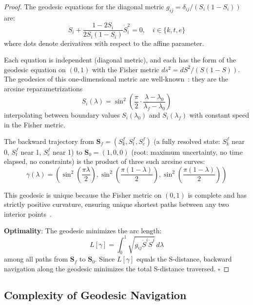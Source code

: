 \documentclass[12pt,twocolumn]{article}
\begin{document}
\begin{proof}
The geodesic equations for the diagonal metric $g_{ij} = \delta_{ij} / (S_i(1-S_i))$ are:
\begin{equation}
\label{eq:geodesic}
\ddot{S}_i + \frac{1-2S_i}{2S_i(1-S_i)} \dot{S}_i^2 = 0, \quad i \in \{k, t, e\}
\end{equation}
where dots denote derivatives with respect to the affine parameter.

Each equation is independent (diagonal metric), and each has the form of the geodesic equation on $(0,1)$ with the Fisher metric $ds^2 = dS^2 / (S(1-S))$. The geodesics of this one-dimensional metric are well-known~\cite{amari1985differential}: they are the arcsine reparametrizations
\begin{equation}
\label{eq:geodesic_solution}
S_i(\lambda) = \sin^2\!\left(\frac{\pi}{2} \cdot \frac{\lambda - \lambda_0}{\lambda_f - \lambda_0}\right)
\end{equation}
interpolating between boundary values $S_i(\lambda_0)$ and $S_i(\lambda_f)$ with constant speed in the Fisher metric.

The backward trajectory from $\mathbf{S}_f = (S_k^f, S_t^f, S_e^f)$ (a fully resolved state: $S_k^f$ near 0, $S_t^f$ near 1, $S_e^f$ near 1) to $\mathbf{S}_0 = (1, 0, 0)$ (root: maximum uncertainty, no time elapsed, no constraints) is the product of three such arcsine curves:
\begin{equation}
\gamma(\lambda) = \left(\sin^2\!\left(\frac{\pi\lambda}{2}\right), \sin^2\!\left(\frac{\pi(1-\lambda)}{2}\right), \sin^2\!\left(\frac{\pi(1-\lambda)}{2}\right)\right)
\end{equation}

This geodesic is unique because the Fisher metric on $(0,1)$ is complete and has strictly positive curvature, ensuring unique shortest paths between any two interior points~\cite{docarmo1992riemannian}.

\textbf{Optimality}: The geodesic minimizes the arc length:
\begin{equation}
L[\gamma] = \int_0^1 \sqrt{g_{ij} \dot{S}^i \dot{S}^j} \, d\lambda
\end{equation}
among all paths from $\mathbf{S}_f$ to $\mathbf{S}_0$. Since $L[\gamma]$ equals the S-distance, backward navigation along the geodesic minimizes the total S-distance traversed. $\square$
\end{proof}

\subsection{Complexity of Geodesic Navigation}
\end{document}
